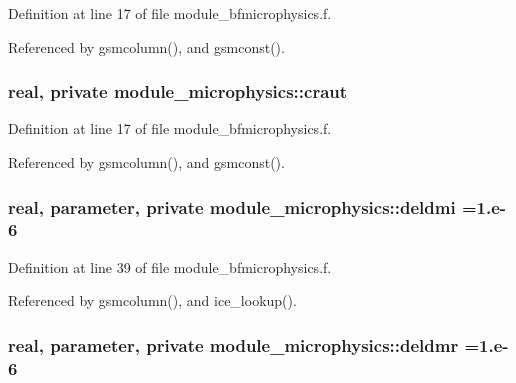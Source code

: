 Definition at line 17 of file module\+\_\+bfmicrophysics.\+f.



Referenced by gsmcolumn(), and gsmconst().

\subsubsection[{\texorpdfstring{craut}{craut}}]{\setlength{\rightskip}{0pt plus 5cm}real, private module\+\_\+microphysics\+::craut\hspace{0.3cm}{\ttfamily [private]}}\hypertarget{namespacemodule__microphysics_aa70387aeb638af57989b45128bfe387d}{}\label{namespacemodule__microphysics_aa70387aeb638af57989b45128bfe387d}


Definition at line 17 of file module\+\_\+bfmicrophysics.\+f.



Referenced by gsmcolumn(), and gsmconst().

\subsubsection[{\texorpdfstring{deldmi}{deldmi}}]{\setlength{\rightskip}{0pt plus 5cm}real, parameter, private module\+\_\+microphysics\+::deldmi =1.e-\/6\hspace{0.3cm}{\ttfamily [private]}}\hypertarget{namespacemodule__microphysics_a50ee0e811da6e52c191f977407e9e47d}{}\label{namespacemodule__microphysics_a50ee0e811da6e52c191f977407e9e47d}


Definition at line 39 of file module\+\_\+bfmicrophysics.\+f.



Referenced by gsmcolumn(), and ice\+\_\+lookup().

\subsubsection[{\texorpdfstring{deldmr}{deldmr}}]{\setlength{\rightskip}{0pt plus 5cm}real, parameter, private module\+\_\+microphysics\+::deldmr =1.e-\/6\hspace{0.3cm}{\ttfamily [private]}}\hypertarget{namespacemodule__microphysics_a8196aeaa83acb0941194563281aa721b}{}\label{namespacemodule__microphysics_a8196aeaa83acb0941194563281aa721b}



